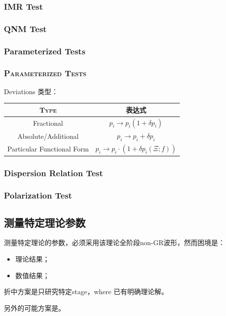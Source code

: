 \documentclass[CJK,aspectratio=169]{beamer}  %
\begin{document}
\subsubsection{IMR Test}


\subsubsection{QNM Test}


\subsubsection{Parameterized Tests}
\begin{frame}
	\frametitle{\textsc{Parameterized Tests}}
	
	\par Deviations 类型：
		\begin{table}[h!]
		\begin{center}
			\begin{tabular}{|c|c|}
				\hline
				\textsc{Type} & 表达式 \\
				\hline
				Fractional & $p_i \longrightarrow p_i(1 + \delta p_i)$ \\
				\hline
				Absolute/Additional & $p_i \longrightarrow p_i + \delta p_i$ \\
				\hline
				Particular Functional Form &  $p_i \longrightarrow p_i \cdot (1 + \delta p_i(\Xi;f))$\\
				\hline
			\end{tabular}
		\end{center}
	\end{table}

\end{frame}

\subsubsection{Dispersion Relation Test}


\subsubsection{Polarization Test}


\subsection{测量特定理论参数}

\begin{frame}
	\par 测量特定理论的参数，必须采用该理论全阶段non-GR波形，然而困境是\cite{wf_modelling_for_LISA}：
	\begin{itemize}
		\item [1. ] 理论结果；
		\item [2. ] 数值结果；
	\end{itemize}
	\par 折中方案是只研究特定stage，where 已有明确理论解。
	\par 另外的可能方案是\cite{ppE}。
\end{frame}
\end{document}
